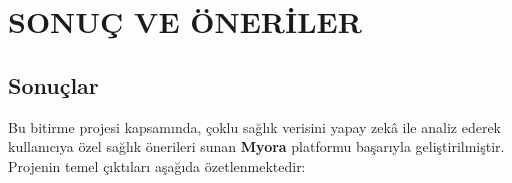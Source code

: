 \section{SONUÇ VE ÖNERİLER}
\label{sec:sonuc}

\subsection{Sonuçlar}

Bu bitirme projesi kapsamında, çoklu sağlık verisini yapay zekâ ile analiz ederek kullanıcıya özel sağlık önerileri sunan \textbf{Myora} platformu başarıyla geliştirilmiştir. Projenin temel çıktıları aşağıda özetlenmektedir:

